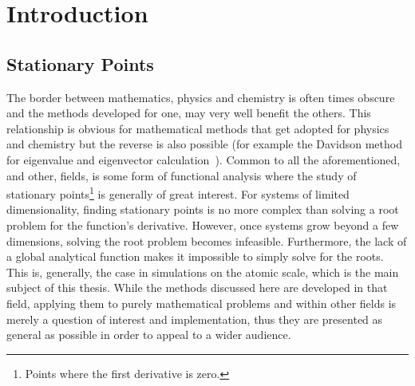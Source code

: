 \chapter{Introduction}
\label{chap:introduction}


\section{Stationary Points}
The border between mathematics, physics and chemistry is often times obscure and the methods developed for one, may very well benefit the others.
This relationship is obvious for mathematical methods that get adopted for physics and chemistry but the reverse is also possible (for example the Davidson method for eigenvalue and eigenvector calculation~\cite{davidson-method-1975}).
Common to all the aforementioned, and other, fields, is some form of functional analysis where the study of stationary points\footnote{Points where the first derivative is zero.} is generally of great interest.
For systems of limited dimensionality, finding stationary points is no more complex than solving a root problem for the function's derivative.
However, once systems grow beyond a few dimensions, solving the root problem becomes infeasible.
Furthermore, the lack of a global analytical function makes it impossible to simply solve for the roots.
This is, generally, the case in simulations on the atomic scale, which is the main subject of this thesis.
While the methods discussed here are developed in that field, applying them to purely mathematical problems and within other fields is merely a question of interest and implementation, thus they are presented as general as possible in order to appeal to a wider audience.

